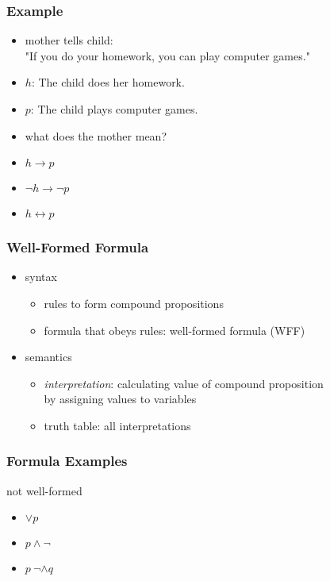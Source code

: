 \documentclass[dvipsnames]{beamer}
\begin{document}
\begin{frame}
  \frametitle{Example}

  \begin{itemize}
    \item mother tells child:\\
      "If you do your homework, you can play computer games."

    \pause
    \medskip
    \item $h$: The child does her homework.
    \item $p$: The child plays computer games.
    \item what does the mother mean?

    \pause
    \medskip
    \item $h \rightarrow p$
    \pause
    \item $\neg h \rightarrow \neg p$
    \pause
    \item $h \leftrightarrow p$
  \end{itemize}
\end{frame}


\begin{frame}
  \frametitle{Well-Formed Formula}

  \begin{itemize}
    \item syntax
    \begin{itemize}
      \item rules to form compound propositions
      \item formula that obeys rules: \alert{well-formed formula} (WFF)
    \end{itemize}

    \pause
    \bigskip
    \item semantics
    \begin{itemize}
      \item \emph{interpretation}: calculating value of compound proposition\\
        by assigning values to variables
      \item truth table: all interpretations
    \end{itemize}
  \end{itemize}
\end{frame}

\begin{frame}
  \frametitle{Formula Examples}

  \begin{exampleblock}{not well-formed}
    \begin{itemize}
      \item $\vee p$
      \item $p \wedge \neg$
      \item $p~\neg \wedge q$
    \end{itemize}
  \end{exampleblock}
\end{frame}
\end{document}
